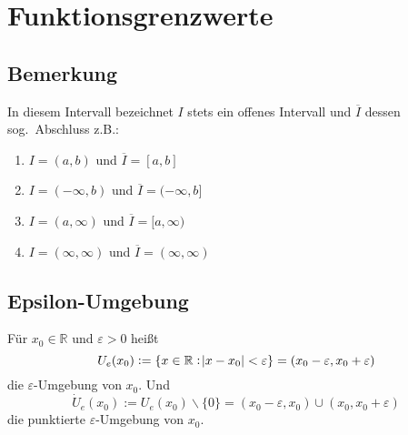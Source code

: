 \documentclass[10pt]{article}
\newcommand{\R}{\mathbb{R}}
\begin{document}
    \section{Funktionsgrenzwerte}

    \subsection{Bemerkung}
    In diesem Intervall bezeichnet $I$ stets ein offenes Intervall und
    $\overline{I}$ dessen sog.\ Abschluss z.B.:
    \begin{enumerate}[label= (\alph*)]
        \item $I = (a, b)$ und $\overline{I} = [a, b]$
        \item $I = (-\infty, b)$ und $\overline{I} = (-\infty, b]$
        \item $I = (a, \infty)$ und $\overline{I} = [a, \infty)$
        \item $I = (\infty, \infty)$ und $\overline{I} = (\infty, \infty)$
    \end{enumerate}

    \subsection{Epsilon-Umgebung}
    Für $x_0 \in \R$ und $\varepsilon > 0$ heißt
    \begin{equation*}
        U_e(x_0) := \{ x \in \R: \abs{x - x_0}<\varepsilon \} =
        (x_0 - \varepsilon, x_0+\varepsilon)
    \end{equation*}
    die $\varepsilon$-Umgebung von $x_0$. Und
    \begin{equation*}
        \dot{U}_e(x_0) := U_e(x_0)\backslash \{0\} =
        (x_0-\varepsilon, x_0) \cup (x_0, x_0+\varepsilon)
    \end{equation*}
    die punktierte $\varepsilon$-Umgebung von $x_0$.
\end{document}
